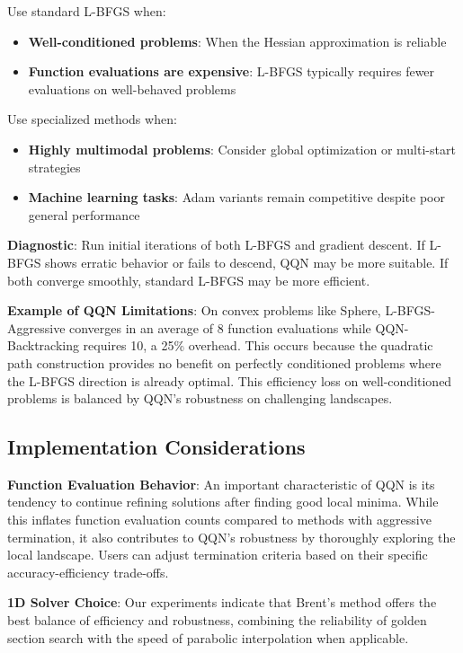 Use standard L-BFGS when:

\begin{itemize}
\tightlist
\item
  \textbf{Well-conditioned problems}: When the Hessian approximation is reliable
\item
  \textbf{Function evaluations are expensive}: L-BFGS typically requires fewer evaluations on well-behaved problems
\end{itemize}

Use specialized methods when:

\begin{itemize}
\tightlist
\item
  \textbf{Highly multimodal problems}: Consider global optimization or multi-start strategies
\item
  \textbf{Machine learning tasks}: Adam variants remain competitive despite poor general performance
\end{itemize}

\textbf{Diagnostic}: Run initial iterations of both L-BFGS and gradient descent. If L-BFGS shows erratic behavior or fails to descend, QQN may be more suitable. If both converge smoothly, standard L-BFGS may be more efficient.

\textbf{Example of QQN Limitations}: On convex problems like Sphere, L-BFGS-Aggressive converges in an average of 8 function evaluations while QQN-Backtracking requires 10, a 25\% overhead. This occurs because the quadratic path construction provides no benefit on perfectly conditioned problems where the L-BFGS direction is already optimal.
This efficiency loss on well-conditioned problems is balanced by QQN's robustness on challenging landscapes.

\hypertarget{implementation-considerations}{%
\subsection{Implementation Considerations}\label{implementation-considerations}}

\textbf{Function Evaluation Behavior}: An important characteristic of QQN is its tendency to continue refining solutions after finding good local minima. While this inflates function evaluation counts compared to methods with aggressive termination, it also contributes to QQN's robustness by thoroughly exploring the local landscape. Users can adjust termination criteria based on their specific accuracy-efficiency trade-offs.

\textbf{1D Solver Choice}: Our experiments indicate that Brent's method offers the best balance of efficiency and robustness, combining the reliability of golden section search with the speed of parabolic interpolation when applicable.

